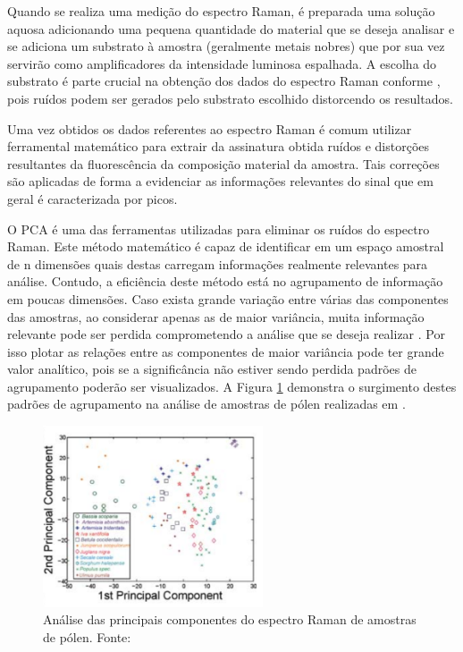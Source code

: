 \documentclass[conference,peerreview]{IEEEtran}
\begin{document}
Quando se realiza uma medição do espectro Raman, é preparada uma solução aquosa adicionando uma pequena quantidade do material que se deseja analisar e se adiciona um substrato à amostra (geralmente metais nobres) que por sua vez servirão como amplificadores da intensidade luminosa espalhada. A escolha do substrato é parte crucial na obtenção dos dados do espectro Raman conforme \cite{Seifert2016}, pois ruídos podem ser gerados pelo substrato escolhido distorcendo os resultados.

Uma vez obtidos os dados referentes ao espectro Raman é comum utilizar ferramental matemático para extrair da assinatura obtida ruídos e distorções resultantes da fluorescência da composição material da amostra. Tais correções são aplicadas de forma a evidenciar as informações relevantes do sinal que em geral é caracterizada por picos.

O PCA é uma das ferramentas utilizadas para eliminar os ruídos do espectro Raman. Este método matemático é capaz de identificar em um espaço amostral de n dimensões quais destas carregam informações realmente relevantes para análise. Contudo, a eficiência deste método está no agrupamento de informação em poucas dimensões. Caso exista grande variação entre várias das componentes das amostras, ao considerar apenas as de maior variância, muita informação relevante pode ser perdida comprometendo a análise que se deseja realizar \cite{Brereton2017}. Por isso plotar as relações entre as componentes de maior variância pode ter grande valor analítico, pois se a significância não estiver sendo perdida padrões de agrupamento poderão ser visualizados. A Figura \ref{pca_exemplo} demonstra o surgimento destes padrões de agrupamento na análise de amostras de pólen realizadas em \cite{Seifert2016}.

\begin{figure}[ht]
\centering
\includegraphics[width=6.5cm]{pca_exemplo}
\caption{Análise das principais componentes do espectro Raman de amostras de pólen. Fonte: \cite{Seifert2016}}
\label{pca_exemplo}
\end{figure}
\end{document}
